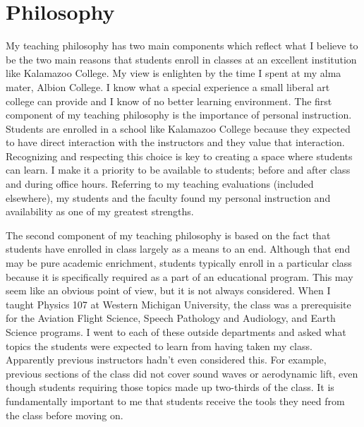  {%
\def\secname{Philosophy}
\section*{\hspace{-\parindent}\secname}
\addcontentsline{toc}{section}{\secname}
My teaching philosophy has two main components which reflect what I believe to be the two main reasons that students enroll in classes at an excellent institution like Kalamazoo College. My view is enlighten by the time I spent at my alma mater, Albion College. I know what a special experience a small liberal art college can provide and I know of no better learning environment. 
The first component of my teaching philosophy is the importance of personal instruction.
 Students are enrolled in %
a school like Kalamazoo College because they expected to have direct interaction with the instructors and they value that interaction. Recognizing and respecting this choice is key to creating a space where students can learn.
I make it a priority to be available to students; before and after class and during office hours. Referring to my teaching evaluations (included elsewhere), my students and the faculty found my personal instruction and availability as one of my greatest strengths.

The second component of my teaching philosophy is based on the fact that students have enrolled in class largely as a means to an end. Although that end may be pure academic enrichment, students typically enroll in a particular class because it is specifically required as a part of an educational program. 
This may seem like an obvious point of view, but it is not always considered.
When I taught Physics 107 at Western Michigan University, the class was a prerequisite for the
Aviation Flight Science, 
Speech Pathology and Audiology, 
and 
Earth Science
programs. I went to each of these outside departments and asked what topics the students were expected to learn from having taken my class. Apparently previous instructors hadn't even considered this. For example, previous sections of the class did not cover sound waves or aerodynamic lift, even though students requiring those topics made up two-thirds of the class.
It is fundamentally important to me that students receive the tools they need from the class before moving on.

%
\def\secname{Goals}
}
